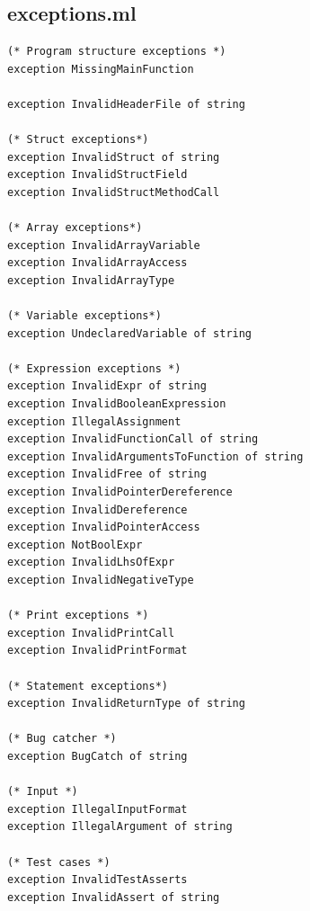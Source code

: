 \documentclass{article}
\begin{document}
\subsection{exceptions.ml}
\begin{lstlisting}
(* Program structure exceptions *)
exception MissingMainFunction

exception InvalidHeaderFile of string

(* Struct exceptions*)
exception InvalidStruct of string
exception InvalidStructField
exception InvalidStructMethodCall

(* Array exceptions*)
exception InvalidArrayVariable
exception InvalidArrayAccess
exception InvalidArrayType

(* Variable exceptions*)
exception UndeclaredVariable of string

(* Expression exceptions *)
exception InvalidExpr of string
exception InvalidBooleanExpression 
exception IllegalAssignment
exception InvalidFunctionCall of string
exception InvalidArgumentsToFunction of string
exception InvalidFree of string
exception InvalidPointerDereference
exception InvalidDereference
exception InvalidPointerAccess
exception NotBoolExpr
exception InvalidLhsOfExpr
exception InvalidNegativeType

(* Print exceptions *)
exception InvalidPrintCall
exception InvalidPrintFormat

(* Statement exceptions*)
exception InvalidReturnType of string

(* Bug catcher *)
exception BugCatch of string

(* Input *)
exception IllegalInputFormat
exception IllegalArgument of string

(* Test cases *)
exception InvalidTestAsserts
exception InvalidAssert of string

\end{lstlisting}
\end{document}
